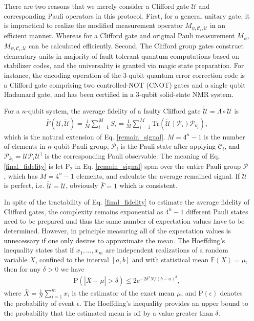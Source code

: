 \documentclass[prl,twocolumn,showpacs]{revtex4-1}
\begin{document}
There are two reasons that we merely consider a Clifford gate $\mathcal{U}$ and corresponding Pauli operators in this protocol. First, for a general unitary gate, it is impractical to realize the modified measurement operator $M_{\psi, \mathcal{C}_i, \mathcal{U}}$ in an efficient manner. Whereas for a Clifford gate and original Pauli measurement $M_\psi$,  $M_{\psi, \mathcal{C}_i, \mathcal{U}}$ can be calculated efficiently\cite{Aaronson2004}. Second, The Clifford group gates construct elementary units in majority of fault-tolerant quantum computations based on stabilizer codes, and the universality is granted via magic state preparation\cite{Bravyi2005}. For instance, the encoding operation of the 3-qubit quantum error correction code is a Clifford gate comprising two controlled-NOT (CNOT) gates and a  single qubit Hadamard gate, and has been certified in a 3-qubit solid-state NMR system\cite{Moussa2012}.

For a $n$-qubit system, the average fidelity of a faulty Clifford gate $\tilde{\mathcal{U}} = \Lambda \circ \mathcal{U}$ is\cite{Alex2013}
\begin{align} \label{final_fidelity}
\bar{F}(\mathcal{U}, \tilde{\mathcal{U}}) = \frac{1}{M}\sum_{i=1}^{M} S_i= \frac{1}{M}\sum_{i=1}^{M}\text{Tr}\left( \tilde{\mathcal{U}} \left( \mathcal{P}_i\right) \mathcal{P}_{k_i}\right),
\end{align}
which is the natural extension of Eq. \ref{remain_signal}.  $M = 4^n-1$ is the number of elements in $n$-qubit Pauli group, $\mathcal{P}_i$ is the Pauli state after applying $\mathcal{C}_i$, and $\mathcal{P}_{k_i} = \mathcal{U} \mathcal{P}_i \mathcal{U}^{\dagger}$ is the corresponding Pauli observable.  The meaning of Eq. \ref{final_fidelity} is let $\text{P}_2$ in Eq. \ref{remain_signal} span over the entire Pauli group $\mathcal{P}$, which has $M = 4^n-1$ elements, and calculate the average remained signal. If $\tilde{\mathcal{U}}$ is perfect, i.e. $\tilde{\mathcal{U}} = \mathcal{U}$, obviously $\bar{F} =1$ which is consistent.

In spite of the tractability of Eq. \ref{final_fidelity} to estimate the average fidelity of Clifford gates, the complexity remains exponential as $4^n-1$ different Pauli states need to be prepared and thus the same number of expectation values have to be determined.  However, in principle measuring all of the expectation values is unnecessary if one only desires to approximate the mean. The Hoeffding's inequality\cite{Venkatesh2012} states that if $x_1, . . . ,x_m$ are independent realizations of
a random variable $X$, confined to the interval $[a, b]$ and with statistical mean $\mathbb{E}(X) = \mu$, then for any $\delta >0$ we have
\begin{align} \label{Hoeffding}
\text{P} \left( |\bar{X}-\mu| > \delta \right) \leq 2e^{-2\delta^2N/(b-a)^2},
\end{align}
where $\bar{X} = \frac{1}{N}\sum_{i=1}^m x_i$ is the estimator of the exact mean $\mu$, and $\text{P}(\epsilon)$ denotes the probability of event $\epsilon$. The Hoeffding's inequality provides an upper bound to the probability that the estimated mean is off by a value greater than $\delta$.
\end{document}
